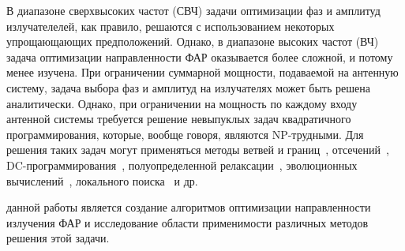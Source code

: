 {В диапазоне сверхвысоких частот (СВЧ) задачи оптимизации фаз и амплитуд излучателелей, как правило, решаются с использованием некоторых упрощающающих предположений. Однако, в диапазоне высоких частот (ВЧ)
задача оптимизации направленности ФАР оказывается более сложной, и потому менее изучена.
При ограничении суммарной мощности, подаваемой на антенную систему, задача выбора фаз и амплитуд на излучателях
может быть решена аналитически.
Однако, при ограничении на мощность по каждому входу антенной системы требуется решение невыпуклых задач квадратичного программирования, которые, вообще говоря, являются NP-трудными. Для решения таких задач могут применяться методы ветвей и границ~, отсечений~, DC-программирования~, полуопределенной релаксации~, эволюционных вычислений~, локального поиска~ и др.
}



{\aim} данной работы является создание алгоритмов оптимизации направленности излучения ФАР и исследование
области применимости различных методов решения этой задачи.

